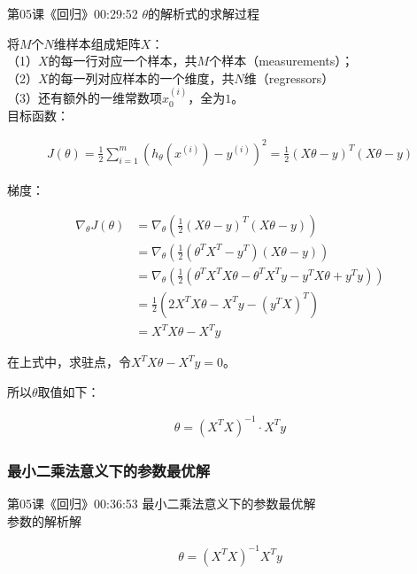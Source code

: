 \documentclass[UTF8]{ctexbook}
\begin{document}
第05课《回归》00:29:52 $\theta$的解析式的求解过程

将$M$个$N$维样本组成矩阵$X$：\\
（1）$X$的每一行对应一个样本，共$M$个样本（measurements）；\\
（2）$X$的每一列对应样本的一个维度，共$N$维（regressors）\\
（3）还有额外的一维常数项$x^{(i)}_{0}$，全为$1$。\\

目标函数：

\begin{equation}
\begin{aligned}
J(\theta)=\frac{1}{2} \sum_{i=1}^{m}(h_{\theta}(x^{(i)}) - y^{(i)})^{2}=\frac{1}{2} (X\theta-y)^{T}(X\theta-y)
\end{aligned}
\end{equation}

梯度：

\begin{equation}
\begin{aligned}
\nabla_{\theta}J(\theta)&=\nabla_{\theta}(\frac{1}{2}(X\theta-y)^{T}(X\theta-y))\\
&=\nabla_{\theta}(\frac{1}{2}(\theta^{T}X^{T}-y^{T})(X\theta-y))\\
&=\nabla_{\theta}(\frac{1}{2}(\theta^{T}X^{T}X\theta-\theta^{T}X^{T}y-y^{T}X\theta+y^{T}y))\\
&=\frac{1}{2}(2X^{T}X\theta-X^{T}y-(y^{T}X)^{T})\\
&=X^{T}X\theta-X^{T}y
\end{aligned}
\end{equation}

在上式中，求驻点，令$X^{T}X\theta-X^{T}y=0$。

所以$\theta$取值如下：

\begin{equation}
\begin{aligned}
\theta=(X^{T}X)^{-1}\cdot X^{T}y
\end{aligned}
\end{equation}

\subsubsection{最小二乘法意义下的参数最优解}

第05课《回归》00:36:53 最小二乘法意义下的参数最优解\\

参数的解析解

\begin{equation}
\begin{aligned}
\theta=(X^{T}X)^{-1} X^{T}y
\end{aligned}
\end{equation}
\end{document}
